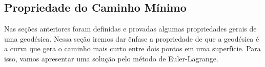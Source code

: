\documentclass{article}
\begin{document}





\subsection{Propriedade do Caminho Mínimo}

Nas seções anteriores foram definidas e provadas algumas propriedades gerais de uma geodésica. Nessa seção iremos dar ênfase a propriedade de que a geodésica é a curva que gera o caminho mais curto entre dois pontos em uma superfície. Para isso, vamos apresentar uma solução pelo método de Euler-Lagrange.
\end{document}

